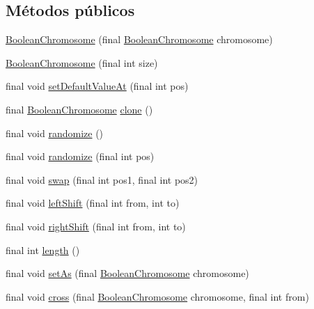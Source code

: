 \subsection*{Métodos públicos}
\begin{DoxyCompactItemize}
\item 
\hyperlink{classjenes_1_1chromosome_1_1_boolean_chromosome_add8b8de56dc676084576bcc657125414}{Boolean\-Chromosome} (final \hyperlink{classjenes_1_1chromosome_1_1_boolean_chromosome}{Boolean\-Chromosome} chromosome)
\item 
\hyperlink{classjenes_1_1chromosome_1_1_boolean_chromosome_aea950688e012d2bfe97f4f24a3fc1db6}{Boolean\-Chromosome} (final int size)
\item 
final void \hyperlink{classjenes_1_1chromosome_1_1_boolean_chromosome_adf2084640bd92e4d36ffea9142e39f8e}{set\-Default\-Value\-At} (final int pos)
\item 
final \hyperlink{classjenes_1_1chromosome_1_1_boolean_chromosome}{Boolean\-Chromosome} \hyperlink{classjenes_1_1chromosome_1_1_boolean_chromosome_a0f0ea11e413734e15dc659a3d0831801}{clone} ()
\item 
final void \hyperlink{classjenes_1_1chromosome_1_1_boolean_chromosome_ab02039091f6803486d54b4f124a39b63}{randomize} ()
\item 
final void \hyperlink{classjenes_1_1chromosome_1_1_boolean_chromosome_af0249c8a5452c3a13960543ab23d4aae}{randomize} (final int pos)
\item 
final void \hyperlink{classjenes_1_1chromosome_1_1_boolean_chromosome_a6359dc1f495e4f7967c6a84f3206de40}{swap} (final int pos1, final int pos2)
\item 
final void \hyperlink{classjenes_1_1chromosome_1_1_boolean_chromosome_a96c0fb9c3f1668cbc9ca175a183f69d4}{left\-Shift} (final int from, int to)
\item 
final void \hyperlink{classjenes_1_1chromosome_1_1_boolean_chromosome_a866689aeafc1b4a5e83c14a1605bc7ce}{right\-Shift} (final int from, int to)
\item 
final int \hyperlink{classjenes_1_1chromosome_1_1_boolean_chromosome_a4665770a8e625c26f3704b41fecb10f8}{length} ()
\item 
final void \hyperlink{classjenes_1_1chromosome_1_1_boolean_chromosome_a16d9851ba21583010d003378a7d59d19}{set\-As} (final \hyperlink{classjenes_1_1chromosome_1_1_boolean_chromosome}{Boolean\-Chromosome} chromosome)
\item 
final void \hyperlink{classjenes_1_1chromosome_1_1_boolean_chromosome_aa1c3c421b6e8e6db44fb7cce7443e669}{cross} (final \hyperlink{classjenes_1_1chromosome_1_1_boolean_chromosome}{Boolean\-Chromosome} chromosome, final int from)

\end{DoxyCompactItemize}
